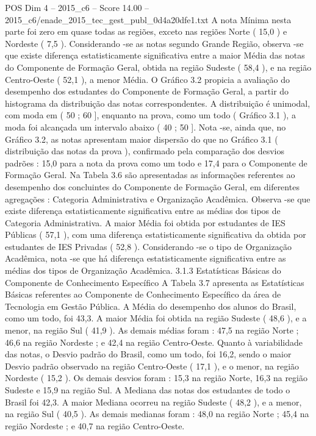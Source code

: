 \begin{textsample}{POS Dim 4 – 2015\_c6 – Score 14.00 – 2015\_c6/enade\_2015\_tec\_gest\_publ\_0d4a20dfe1.txt}
A nota Mínima nesta parte foi zero em quase todas as regiões, exceto nas regiões Norte ( 15,0 ) e Nordeste ( 7,5 ).
Considerando -se as notas segundo Grande Região, observa -se que existe diferença estatisticamente significativa entre a maior Média das notas do Componente de Formação Geral, obtida na região Sudeste ( 58,4 ), e na região Centro-Oeste ( 52,1 ), a menor Média.
O Gráfico 3.2 propicia a avaliação do desempenho dos estudantes do Componente de Formação Geral, a partir do histograma da distribuição das notas correspondentes.
A distribuição é unimodal, com moda em ( 50 ; 60 ], enquanto na prova, como um todo ( Gráfico 3.1 ), a moda foi alcançada um intervalo abaixo ( 40 ; 50 ].
Nota -se, ainda que, no Gráfico 3.2, as notas apresentam maior dispersão do que no Gráfico 3.1 ( distribuição das notas da prova ), confirmado pela comparação dos desvios padrões : 15,0 para a nota da prova como um todo e 17,4 para o Componente de Formação Geral.
Na Tabela 3.6 são apresentadas as informações referentes ao desempenho dos concluintes do Componente de Formação Geral, em diferentes agregações : Categoria Administrativa e Organização Acadêmica.
Observa -se que existe diferença estatisticamente significativa entre as médias dos tipos de Categoria Administrativa.
A maior Média foi obtida por estudantes de IES Públicas ( 57,1 ), com uma diferença estatisticamente significativa da obtida por estudantes de IES Privadas ( 52,8 ).
Considerando -se o tipo de Organização Acadêmica, nota -se que há diferença estatisticamente significativa entre as médias dos tipos de Organização Acadêmica. 3.1.3 Estatísticas Básicas do Componente de Conhecimento Específico A Tabela 3.7 apresenta as Estatísticas Básicas referentes ao Componente de Conhecimento Específico da área de Tecnologia em Gestão Pública.
A Média do desempenho dos alunos do Brasil, como um todo, foi 43,3.
A maior Média foi obtida na região Sudeste ( 48,6 ), e a menor, na região Sul ( 41,9 ).
As demais médias foram : 47,5 na região Norte ; 46,6 na região Nordeste ; e 42,4 na região Centro-Oeste.
Quanto à variabilidade das notas, o Desvio padrão do Brasil, como um todo, foi 16,2, sendo o maior Desvio padrão observado na região Centro-Oeste ( 17,1 ), e o menor, na região Nordeste ( 15,2 ).
Os demais desvios foram : 15,3 na região Norte, 16,3 na região Sudeste e 15,9 na região Sul.
A Mediana das notas dos estudantes de todo o Brasil foi 42,3.
A maior Mediana ocorreu na região Sudeste ( 48,2 ), e a menor, na região Sul ( 40,5 ).
As demais medianas foram : 48,0 na região Norte ; 45,4 na região Nordeste ; e 40,7 na região Centro-Oeste.

\end{textsample}
